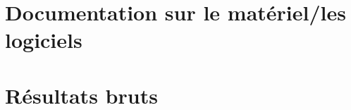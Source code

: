 \documentclass[a4paper, 11pt, french]{report}
\begin{document}
                                                                                                                                                                                                                                                                                             \chapter{Documentation
                                                                                                                                                                                                                                                                                             sur
                                                                                                                                                                                                                                                                                             le
                                                                                                                                                                                                                                                                                             matériel/les
                                                                                                                                                                                                                                                                                             logiciels}
                                                                                                                                                                                                                                                                                               \chapter{Résultats
                                                                                                                                                                                                                                                                                               bruts}
                                                                                                                                                                                                                                                                                                 
\end{document}
